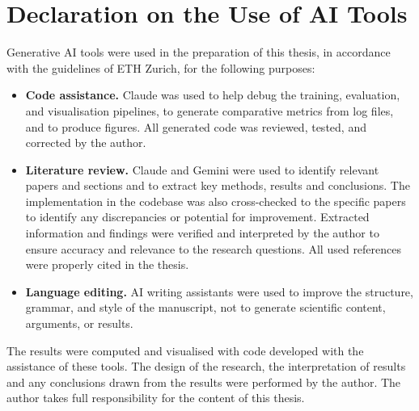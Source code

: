 \par
\vspace{\baselineskip}
{\let\cleardoublepage\relax\let\clearpage\relax
 \par
 \chapter*{Declaration on the Use of AI Tools}}
Generative AI tools were used in the preparation of this thesis, in accordance
with the guidelines of ETH Zurich, for the following purposes:

\begin{itemize}
\item \textbf{Code assistance.} Claude was used to help debug the training,
    evaluation, and visualisation pipelines, to generate comparative metrics from  log files, and to produce figures. All generated code was reviewed, tested,
    and corrected by the author.
\item \textbf{Literature review.} Claude and Gemini were used to identify  relevant papers and sections and to extract key methods, results and conclusions. The implementation in the codebase was also cross-checked to the specific papers to identify any discrepancies or potential for improvement.
Extracted information and findings were verified and interpreted by the author to ensure accuracy and relevance to the research questions. All used references were properly cited in the thesis.
\item \textbf{Language editing.}  AI writing assistants were used to improve the structure, grammar, and style of the manuscript, not to generate scientific
    content, arguments, or results.
\end{itemize}

The results were computed and visualised with code developed with the assistance of these tools. The design of the research, the interpretation of results and any conclusions drawn from the results were performed by the author. The author takes full responsibility for the content of this thesis. 
